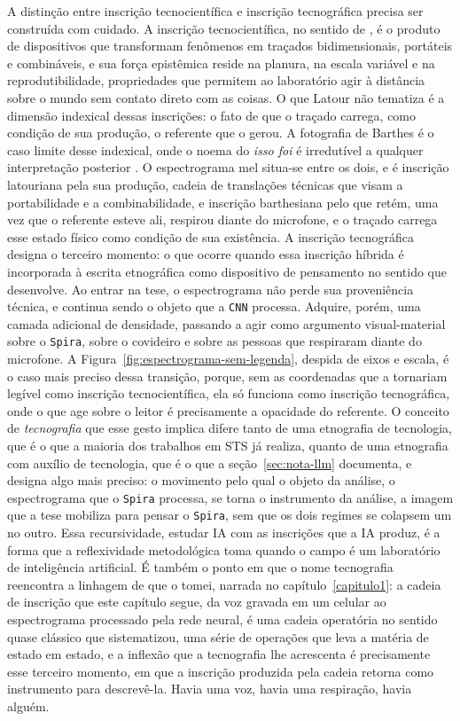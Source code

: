 A distinção entre inscrição tecnocientífica e inscrição tecnográfica precisa ser construída com cuidado. A inscrição tecnocientífica, no sentido de \textcite{Latour1986Visualization}, é o produto de dispositivos que transformam fenômenos em traçados bidimensionais, portáteis e combináveis, e sua força epistêmica reside na planura, na escala variável e na reprodutibilidade, propriedades que permitem ao laboratório agir à distância sobre o mundo sem contato direto com as coisas. O que Latour não tematiza é a dimensão indexical dessas inscrições: o fato de que o traçado carrega, como condição de sua produção, o referente que o gerou. A fotografia de Barthes é o caso limite desse indexical, onde o noema do \textit{isso foi} é irredutível a qualquer interpretação posterior \parencite[p.~120]{Barthes1984}. O espectrograma mel situa-se entre os dois, e é inscrição latouriana pela sua produção, cadeia de translações técnicas que visam a portabilidade e a combinabilidade, e inscrição barthesiana pelo que retém, uma vez que o referente esteve ali, respirou diante do microfone, e o traçado carrega esse estado físico como condição de sua existência. A inscrição tecnográfica designa o terceiro momento: o que ocorre quando essa inscrição híbrida é incorporada à escrita etnográfica como dispositivo de pensamento no sentido que \textcite{Bruno2019Tese} desenvolve. Ao entrar na tese, o espectrograma não perde sua proveniência técnica, e continua sendo o objeto que a \texttt{CNN} processa. Adquire, porém, uma camada adicional de densidade, passando a agir como argumento visual-material sobre o \texttt{Spira}, sobre o covideiro e sobre as pessoas que respiraram diante do microfone. A Figura~\ref{fig:espectrograma-sem-legenda}, despida de eixos e escala, é o caso mais preciso dessa transição, porque, sem as coordenadas que a tornariam legível como inscrição tecnocientífica, ela só funciona como inscrição tecnográfica, onde o que age sobre o leitor é precisamente a opacidade do referente. O conceito de \textit{tecnografia} que esse gesto implica difere tanto de uma etnografia de tecnologia, que é o que a maioria dos trabalhos em STS já realiza, quanto de uma etnografia com auxílio de tecnologia, que é o que a seção~\ref{sec:nota-llm} documenta, e designa algo mais preciso: o movimento pelo qual o objeto da análise, o espectrograma que o \texttt{Spira} processa, se torna o instrumento da análise, a imagem que a tese mobiliza para pensar o \texttt{Spira}, sem que os dois regimes se colapsem um no outro. Essa recursividade, estudar IA com as inscrições que a IA produz, é a forma que a reflexividade metodológica toma quando o campo é um laboratório de inteligência artificial. É também o ponto em que o nome tecnografia reencontra a linhagem de que o tomei, narrada no capítulo~\ref{capitulo1}: a cadeia de inscrição que este capítulo segue, da voz gravada em um celular ao espectrograma processado pela rede neural, é uma cadeia operatória no sentido quase clássico que \textcite{Lemonnier1992Elements} sistematizou, uma série de operações que leva a matéria de estado em estado, e a inflexão que a tecnografia lhe acrescenta é precisamente esse terceiro momento, em que a inscrição produzida pela cadeia retorna como instrumento para descrevê-la. Havia uma voz, havia uma respiração, havia alguém.

